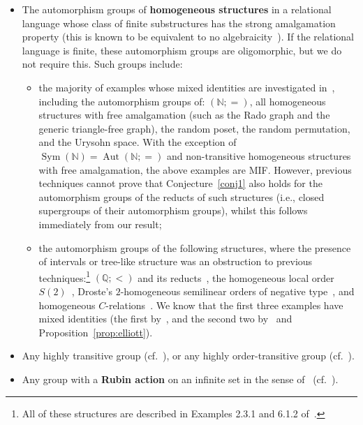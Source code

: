 \documentclass{article}
\theoremstyle{remark}
\theoremstyle{definition}
\DeclareMathOperator{\Aut}{Aut}
\DeclareMathOperator{\Sym}{Sym}
\DeclareMathOperator{\ZZ}{Z}
\newcommand{\zar}{\tau_{\ZZ}}
\begin{document}
\begin{itemize}
\item The automorphism groups of  \textbf{homogeneous structures} in a relational language whose class of finite substructures has the strong amalgamation property  (this is known to be equivalent to no algebraicity~\cite{homogeneous}). If the  relational language is finite, these automorphism groups are oligomorphic, but we do not require this. Such groups include:
\begin{itemize}
\item the majority of examples whose mixed identities are investigated in~\cite{bodirsky2024mixed, ghadernezhad2019group, etedadialiabadi2021dense}, including the automorphism groups of: $(\mathbb{N}; =)$, {all} homogeneous structures with free amalgamation (such as the Rado graph and the generic triangle-free graph), the random poset, the random permutation, and the Urysohn space. With the exception of $\Sym(\mathbb{N})=\Aut(\mathbb{N}; =)$ and non-transitive homogeneous structures with free amalgamation, the above examples are MIF. However, previous techniques cannot prove that Conjecture~\ref{conj1} also holds for
the automorphism groups of the reducts of such structures (i.e., closed supergroups of their automorphism groups), whilst this follows immediately from our result;%
\item the automorphism groups of the following structures, where the presence of intervals or tree-like structure was an obstruction to previous techniques:\footnote{All of these structures are described in Examples 2.3.1 and 6.1.2 of~\cite{homogeneous}.} $(\mathbb{Q}; <)$ and its reducts~\cite{cameron1976transitivity}, the homogeneous local order $S(2)$~\cite{cameron1981orbits}, Droste's $2$-homogeneous semilinear orders of negative type~\cite{droste1985structure}, and homogeneous $C$-relations~\cite{adeleke1998relations}. We know that the first three examples have mixed identities (the first by~\cite{bodirsky2024mixed}, and the second two by~\cite{ghadernezhad2019group} and %
Proposition~\ref{prop:elliott}).

\end{itemize}
\item Any highly transitive group (cf.~\cite{hull2016transitivity}), or any highly order-transitive group (cf.~\cite{glass1991highly}).
\item Any group with a \textbf{Rubin action} on an infinite set in the sense of{~\cite[p.158]{belk2025short} (cf.~\cite{rubin1989reconstruction, kim2021structure}).} 


\end{itemize}
\end{document}
